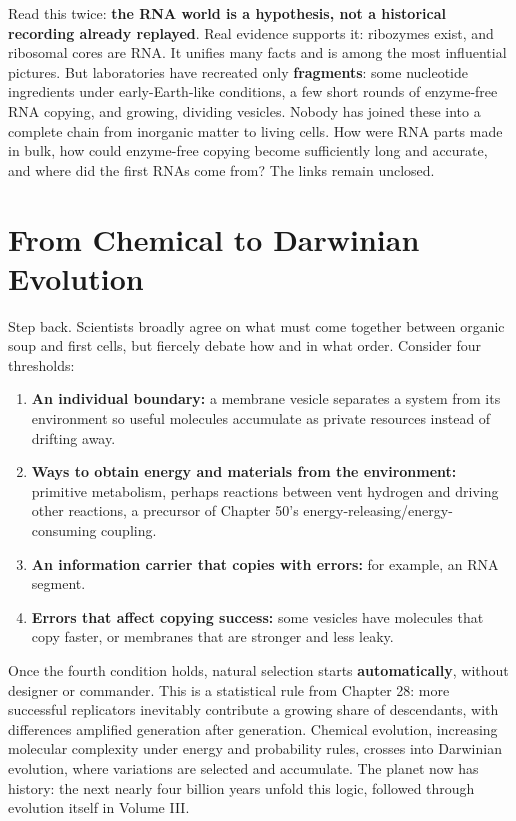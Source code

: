 Read this twice: \textbf{the RNA world is a hypothesis, not a historical recording already replayed}. Real evidence supports it: ribozymes exist, and ribosomal cores are RNA. It unifies many facts and is among the most influential pictures. But laboratories have recreated only \textbf{fragments}: some nucleotide ingredients under early-Earth-like conditions, a few short rounds of enzyme-free RNA copying, and growing, dividing vesicles. Nobody has joined these into a complete chain from inorganic matter to living cells. How were RNA parts made in bulk, how could enzyme-free copying become sufficiently long and accurate, and where did the first RNAs come from? The links remain unclosed.

\section{From Chemical to Darwinian Evolution}

Step back. Scientists broadly agree on what must come together between organic soup and first cells, but fiercely debate how and in what order. Consider four thresholds:

\begin{enumerate}[itemsep=2pt]
\item \textbf{An individual boundary:} a membrane vesicle separates a system from its environment so useful molecules accumulate as private resources instead of drifting away.
\item \textbf{Ways to obtain energy and materials from the environment:} primitive metabolism, perhaps reactions between vent hydrogen and  driving other reactions, a precursor of Chapter 50's energy-releasing/energy-consuming coupling.
\item \textbf{An information carrier that copies with errors:} for example, an RNA segment.
\item \textbf{Errors that affect copying success:} some vesicles have molecules that copy faster, or membranes that are stronger and less leaky.
\end{enumerate}

Once the fourth condition holds, natural selection starts \textbf{automatically}, without designer or commander. This is a statistical rule from Chapter 28: more successful replicators inevitably contribute a growing share of descendants, with differences amplified generation after generation. Chemical evolution, increasing molecular complexity under energy and probability rules, crosses into Darwinian evolution, where variations are selected and accumulate. The planet now has history: the next nearly four billion years unfold this logic, followed through evolution itself in Volume III.

